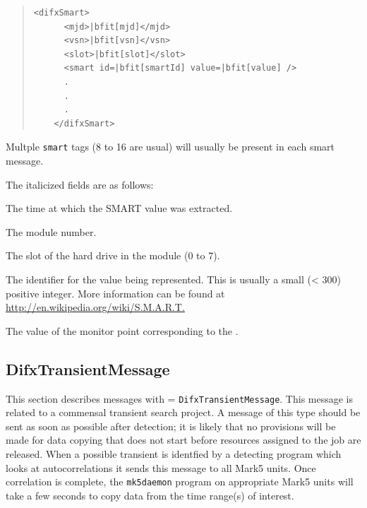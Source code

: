 \begin{description}
\begin{quotation}
\begin{Verbatim}[commandchars=\|\[\]]
    <difxSmart>
      <mjd>|bfit[mjd]</mjd>
      <vsn>|bfit[vsn]</vsn>
      <slot>|bfit[slot]</slot>
      <smart id=|bfit[smartId] value=|bfit[value] />
      .
      .
      .
    </difxSmart>
\end{Verbatim}
\end{quotation}

Multple {\tt smart} tags (8 to 16 are usual) will usually be present in each smart message.

\noindent The italicized fields are as follows:

\begin{description}
\item{} The time at which the SMART value was extracted.
\item{} The module number.
\item{} The slot of the hard drive in the module (0 to 7).
\item{} The identifier for the value being represented.
This is usually a small (< 300) positive integer.
More information can be found at \url{http://en.wikipedia.org/wiki/S.M.A.R.T.}
\item{} The value of the monitor point corresponding to the .
\end{description}






\subsection{DifxTransientMessage}

This section describes messages with  = {\tt DifxTransientMessage}.
This message is related to a commensal transient search project.
A message of this type should be sent as soon as possible after detection; it is likely that no provisions will be made for data copying that does not start before resources assigned to the job are released.
When a possible transient is identfied by a detecting program which looks at autocorrelations it sends this message to all Mark5 units.  
Once correlation is complete, the {\tt mk5daemon} program on appropriate Mark5 units will take a few seconds to copy data from the time range(s) of interest.


\end{description}
